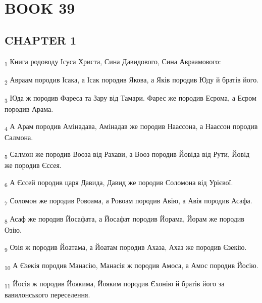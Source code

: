 \section{BOOK 39}
\subsection{CHAPTER 1}
\begin{tcolorbox}
\textsubscript{1} Книга родоводу Ісуса Христа, Сина Давидового, Сина Авраамового:
\end{tcolorbox}
\begin{tcolorbox}
\textsubscript{2} Авраам породив Ісака, а Ісак породив Якова, а Яків породив Юду й братів його.
\end{tcolorbox}
\begin{tcolorbox}
\textsubscript{3} Юда ж породив Фареса та Зару від Тамари. Фарес же породив Есрома, а Есром породив Арама.
\end{tcolorbox}
\begin{tcolorbox}
\textsubscript{4} А Арам породив Амінадава, Амінадав же породив Наассона, а Наассон породив Салмона.
\end{tcolorbox}
\begin{tcolorbox}
\textsubscript{5} Салмон же породив Вооза від Рахави, а Вооз породив Йовіда від Рути, Йовід же породив Єссея.
\end{tcolorbox}
\begin{tcolorbox}
\textsubscript{6} А Єссей породив царя Давида, Давид же породив Соломона від Урієвої.
\end{tcolorbox}
\begin{tcolorbox}
\textsubscript{7} Соломон же породив Ровоама, а Ровоам породив Авію, а Авія породив Асафа.
\end{tcolorbox}
\begin{tcolorbox}
\textsubscript{8} Асаф же породив Йосафата, а Йосафат породив Йорама, Йорам же породив Озію.
\end{tcolorbox}
\begin{tcolorbox}
\textsubscript{9} Озія ж породив Йоатама, а Йоатам породив Ахаза, Ахаз же породив Єзекію.
\end{tcolorbox}
\begin{tcolorbox}
\textsubscript{10} А Єзекія породив Манасію, Манасія ж породив Амоса, а Амос породив Йосію.
\end{tcolorbox}
\begin{tcolorbox}
\textsubscript{11} Йосія ж породив Йоякима, Йояким породив Єхонію й братів його за вавилонського переселення.
\end{tcolorbox}
